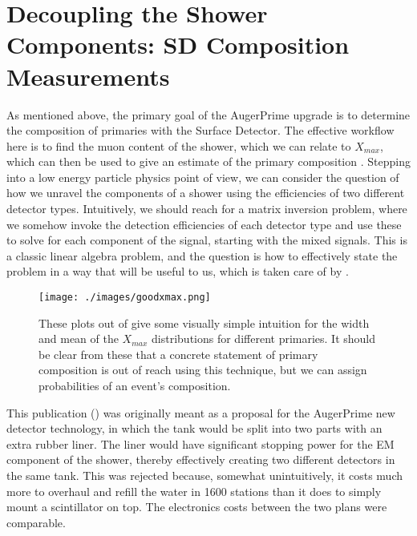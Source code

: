 \section{Decoupling the Shower Components: SD Composition Measurements} 
\label{showercomp}
As mentioned above, the primary goal of the AugerPrime upgrade is to determine the composition of primaries with the Surface Detector. The effective workflow here is to find the muon content of the shower, which we can relate to $X_{max}$, which can then be used to give an estimate of the primary composition \cite{primeuniv, toprime, primepdr,xmaxcomp}. Stepping into a low energy particle physics point of view, we can consider the question of how we unravel the components of a shower using the efficiencies of two different detector types. Intuitively, we should reach for a matrix inversion problem, where we somehow invoke the detection efficiencies of each detector type and use these to solve for each component of the signal, starting with the mixed signals. This is a classic linear algebra problem, and the question is how to effectively state the problem in a way that will be useful to us, which is taken care of by \textcite{matinv}. 
\begin{center}
\begin{figure}[H]
\texttt{[image: ./images/goodxmax.png]}
\caption[$X_{max}$ Distributions]{These plots out of \textcite{xmaxcomp} give some visually simple intuition for the width and mean of the $X_{max}$ distributions for different primaries. It should be clear from these that a concrete statement of primary composition is out of reach using this technique, but we can assign probabilities of an event's composition.}
\label{goodxmax}
\end{figure}
\end{center}
This publication (\cite{matinv}) was originally meant as a proposal for the AugerPrime new detector technology, in which the tank would be split into two parts with an extra rubber liner. The liner would have significant stopping power for the EM component of the shower, thereby effectively creating two different detectors in the same tank. This was rejected because, somewhat unintuitively, it costs much more to overhaul and refill the water in 1600 stations than it does to simply mount a scintillator on top. The electronics costs between the two plans were comparable.

